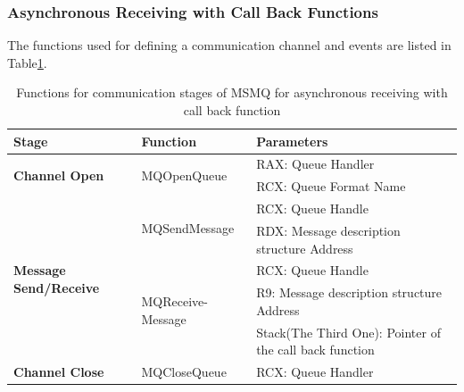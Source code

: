 \subsubsection{Asynchronous Receiving with Call Back Functions}
The functions used for defining a communication channel and events are listed in Table\ref{msmqasynfunctionscallback}.
    \begin{table}[h]
        \centering
        \caption{Functions for communication stages of MSMQ for asynchronous receiving with call back function}
        \label{msmqasynfunctionscallback}
        \begin{tabular}{|l|l|l|}
            \hline
             \textbf{Stage} & \textbf{Function}& \textbf{Parameters}  \\
             \hline
             \multirow{2}{*}{{\textbf{Channel Open}}}
             &\multirow{2}{*}{{MQOpenQueue}} &  RAX: Queue Handler\\
              \cline{3-3} 
             & &  RCX: Queue Format Name\\
            \hline
             \multirow{5}{*}{\parbox{2.5cm}{\textbf{Message Send/Receive}}}
             &\multirow{2}{*}{MQSendMessage} &  RCX: Queue Handle \\
              \cline{3-3} 
             &&  RDX: Message description structure Address \\
            \cline{2-3}
             & \multirow{3}{*}{\parbox{2.5cm}{MQReceive-Message}}&  RCX: Queue Handle \\
              \cline{3-3} 
              &&  R9: Message description structure Address \\
                            \cline{3-3} 
              &&  Stack(The Third One): Pointer of the call back function \\
            \hline
            \textbf{Channel Close} &MQCloseQueue & RCX: Queue Handler \\
            \hline
        \end{tabular}
    \end{table}


